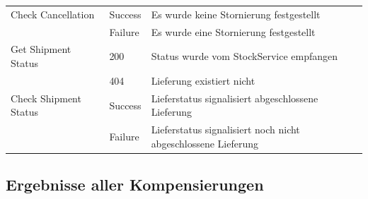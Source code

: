 \begin{center}
\begin{tabular}[h]{|p{3cm}|p{1.5cm}|p{11cm}|}
		Check Cancellation 	& Success	& Es wurde keine Stornierung festgestellt \\
							& Failure	& Es wurde eine Stornierung festgestellt \\ \hline
		Get Shipment Status	& 200 		& Status wurde vom StockService empfangen \\
							& 404		& Lieferung existiert nicht \\ \hline
		Check Shipment Status& Success	& Lieferstatus signalisiert abgeschlossene Lieferung \\
							& Failure 	& Lieferstatus signalisiert noch nicht abgeschlossene Lieferung \\ \hline
	\end{tabular}
\end{center}
\FloatBarrier

\subsection{Ergebnisse aller Kompensierungen}
